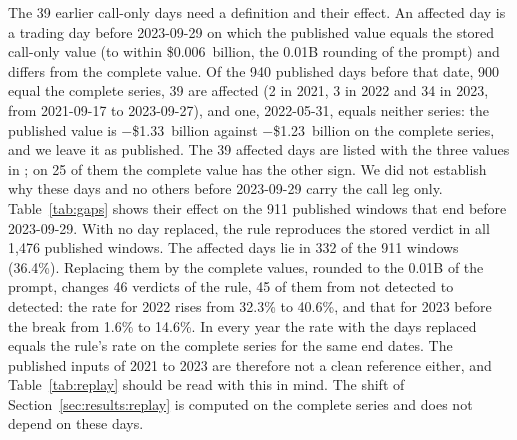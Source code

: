 The 39 earlier call-only days need a definition and their effect. An affected day is a trading day before 2023-09-29 on which the published value equals the stored call-only value (to within \$0.006~billion, the 0.01B rounding of the prompt) and differs from the complete value. Of the 940 published days before that date, 900 equal the complete series, 39 are affected (2 in 2021, 3 in 2022 and 34 in 2023, from 2021-09-17 to 2023-09-27), and one, 2022-05-31, equals neither series: the published value is $-$\$1.33~billion against $-$\$1.23~billion on the complete series, and we leave it as published. The 39 affected days are listed with the three values in ; on 25 of them the complete value has the other sign. We did not establish why these days and no others before 2023-09-29 carry the call leg only. Table~\ref{tab:gaps} shows their effect on the 911 published windows that end before 2023-09-29. With no day replaced, the rule reproduces the stored verdict in all 1{,}476 published windows. The affected days lie in 332 of the 911 windows (36.4\%). Replacing them by the complete values, rounded to the 0.01B of the prompt, changes 46 verdicts of the rule, 45 of them from not detected to detected: the rate for 2022 rises from 32.3\% to 40.6\%, and that for 2023 before the break from 1.6\% to 14.6\%. In every year the rate with the days replaced equals the rule's rate on the complete series for the same end dates. The published inputs of 2021 to 2023 are therefore not a clean reference either, and Table~\ref{tab:replay} should be read with this in mind. The shift of Section~\ref{sec:results:replay} is computed on the complete series and does not depend on these days.

